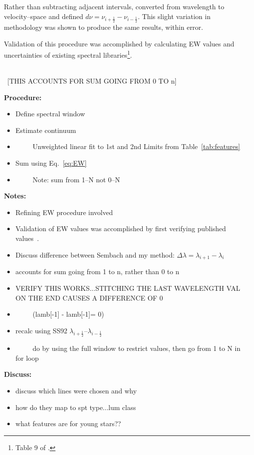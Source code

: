 Rather than subtracting adjacent intervals, 
\cite{Sembach_1992} converted from wavelength to velocity--space and defined 
$d\nu = \nu_{i+\frac{1}{2}} - \nu_{i-\frac{1}{2}}$.  This slight variation in 
methodology was shown to produce the same results, within error.



Validation of this procedure was accomplished by calculating EW values and 
uncertainties of existing spectral libraries\footnote{Table 9 of \cite{Rayner_2009}.}.  



\noindent [CAN THIS BE EXPRESSED AS $\lambda_{i+1} - \lambda_{i} == \lambda_{i} - \lambda_{i-1}$]\\
~[THIS ACCOUNTS FOR SUM GOING FROM 0 TO n]





{\bf Procedure:}\\
\begin{itemize}
	\item{} Define spectral window
	\item{} Estimate continuum
	\item{}~~~~~Unweighted linear fit to 1st and 2nd Limits from Table~\ref{tab:features}
	\item{} Sum using Eq.~\ref{eq:EW}
	\item{}~~~~~Note: sum from 1--N not 0--N
\end{itemize}


{\bf Notes:}\\
\begin{itemize}
	\item{} Refining EW procedure involved
	\item{} Validation of EW values was accomplished by first verifying published values~\cite{Rayner_2009}.
	\item{} Discuss difference between Sembach and my method: $\Delta\lambda = \lambda_{i+1} - \lambda_{i}$
	\item{} accounts for sum going from 1 to n, rather than 0 to n
	\item{} VERIFY THIS WORKS...STITCHING THE LAST WAVELENGTH VAL ON THE END CAUSES A DIFFERENCE OF 0
	\item{}~~~~~(lamb[-1] - lamb[-1]= 0)
	\item{} recalc using SS92 $\lambda_{i+\frac{1}{2}}$--$\lambda_{i-\frac{1}{2}}$
	\item{}~~~~~do by using the full window to restrict values, then go from 1 to N in for loop
\end{itemize}




{\bf Discuss:}\\
\begin{itemize}
	\item{} discuss which lines were chosen and why
	\item{} how do they map to spt type...lum class
	\item{} what features are for young stars??
\end{itemize}


